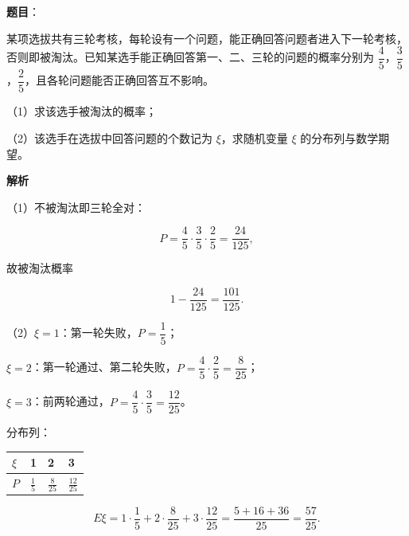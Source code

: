 \begin{answer}

\textbf{题目}：

某项选拔共有三轮考核，每轮设有一个问题，能正确回答问题者进入下一轮考核，否则即被淘汰。已知某选手能正确回答第一、二、三轮的问题的概率分别为 $\dfrac45$，$\dfrac35$，$\dfrac25$，且各轮问题能否正确回答互不影响。

（1）求该选手被淘汰的概率；

（2）该选手在选拔中回答问题的个数记为 $\xi$，求随机变量 $\xi$ 的分布列与数学期望。

\textbf{解析}

（1）不被淘汰即三轮全对：

\nopagebreak[4]
\[P=\frac45\cdot\frac35\cdot\frac25=\frac{24}{125},\]

故被淘汰概率

\nopagebreak[4]
\[1-\frac{24}{125}=\frac{101}{125}.\]

（2）$\xi=1$：第一轮失败，$P=\dfrac15$；

$\xi=2$：第一轮通过、第二轮失败，$P=\dfrac45\cdot\dfrac25=\dfrac8{25}$；

$\xi=3$：前两轮通过，$P=\dfrac45\cdot\dfrac35=\dfrac{12}{25}$。

分布列：

\begin{center}
\begin{tabular}{llll}
\toprule
$\xi$ & 1 & 2 & 3 \\
\midrule
$P$ & $\frac15$ & $\frac8{25}$ & $\frac{12}{25}$ \\
\bottomrule
\end{tabular}
\end{center}

\nopagebreak[4]
\[E\xi=1\cdot\frac15+2\cdot\frac8{25}+3\cdot\frac{12}{25}
=\frac{5+16+36}{25}=\frac{57}{25}.\]


\end{answer}
